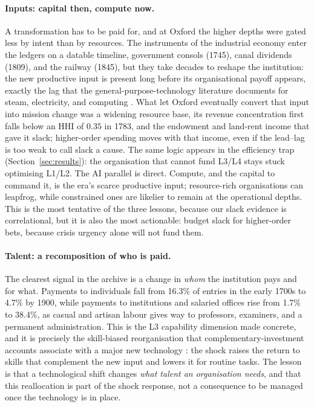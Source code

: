 \documentclass[11pt]{article}
\begin{document}
\paragraph{Inputs: capital then, compute now.} A transformation has to be paid for, and at Oxford
the higher depths were gated less by intent than by resources. The instruments of the industrial
economy enter the ledgers on a datable timeline, government consols (1745), canal dividends
(1809), and the railway (1845), but they take decades to reshape the institution: the new
productive input is present long before its organisational payoff appears, exactly the lag that
the general-purpose-technology literature documents for steam, electricity, and computing
\citep{david1990dynamo, bresnahan1995gpt}. What let Oxford eventually convert that input into
mission change was a widening resource base, its revenue concentration first falls below an HHI of
$0.35$ in 1783, and the endowment and land-rent income that gave it slack; higher-order spending
moves with that income, even if the lead--lag is too weak to call slack a cause. The same logic
appears in the efficiency trap (Section~\ref{sec:results}): the organisation that cannot fund
L3/L4 stays stuck optimising L1/L2. The AI parallel is direct. Compute, and the capital to command
it, is the era's scarce productive input; resource-rich organisations can leapfrog, while
constrained ones are likelier to remain at the operational depths. This is the most tentative of
the three lessons, because our slack evidence is correlational, but it is also the most actionable:
budget slack for higher-order bets, because crisis urgency alone will not fund them.

\paragraph{Talent: a recomposition of who is paid.} The clearest signal in the archive is a change
in \emph{whom} the institution pays and for what. Payments to individuals fall from 16.3\% of
entries in the early 1700s to 4.7\% by 1900, while payments to institutions and salaried offices
rise from 1.7\% to 38.4\%, as casual and artisan labour gives way to professors, examiners, and a
permanent administration. This is the L3 capability dimension made concrete, and it is precisely
the skill-biased reorganisation that complementary-investment accounts associate with a major new
technology \citep{autor2003skill, bresnahan2002it}: the shock raises the return to skills that
complement the new input and lowers it for routine tasks. The lesson is that a technological shift
changes \emph{what talent an organisation needs}, and that this reallocation is part of the shock
response, not a consequence to be managed once the technology is in place.
\end{document}
